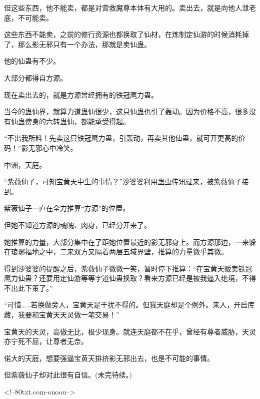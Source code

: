 \begin{this_body}
但这些东西，他不能卖，都是对营救魔尊本体有大用的。卖出去，就是向他人泄老底，不可能卖。

这些东西不能卖，之前的修行资源也都换取了仙材，在炼制定仙游的时候消耗掉了，那么影无邪只有一个办法，那就是卖仙蛊。

他的仙蛊有不少。

大部分都得自方源。

现在卖出去的，就是方源曾经拥有的铁冠鹰力蛊。

当今的蛊仙界，就算力道蛊仙很少，这只仙蛊也引了轰动。因为价格不高，很多没有仙蛊傍身的六转蛊仙，都能承受得起。

“不出我所料！先卖这只铁冠鹰力蛊，引轰动，再卖其他仙蛊，就可开更高的价码！”影无邪心中冷笑。

中洲，天庭。

“紫薇仙子，可知宝黄天中生的事情？”沙婆婆利用蛊虫传讯过来，被紫薇仙子接到。

紫薇仙子一直在全力推算“方源”的位置。

但她不知道方源的魂魄、肉身，已经分开来了。

她推算的力量，大部分集中在了距她位置最近的影无邪身上。而方源那边，一来躲在琅琊福地之中，二来双方又隔着两层五域界壁，推算的力量微乎其微。

得到沙婆婆的提醒之后，紫薇仙子微微一笑，暂时停下推算：“在宝黄天贩卖铁冠鹰力仙蛊？还要用定仙游等等宇道仙蛊换取？看来方源已经是被我逼入绝境，不得不出此下策了。”

“可惜……若换做旁人，宝黄天是干扰不得的。但我天庭却是个例外。来人，开启库藏，我要和宝黄天天灵做一笔交易！”

宝黄天的天灵，高傲无比，极少现身。就连天庭都不在乎，曾经有尊者威胁，天灵亦宁死不屈，让尊者无奈。

偌大的天庭，想要强逼宝黄天排挤影无邪出去，也是不可能的事情。

但紫薇仙子却对此很有自信。(未完待续。)

<!--80txt.com-ouoou-->

\end{this_body}

